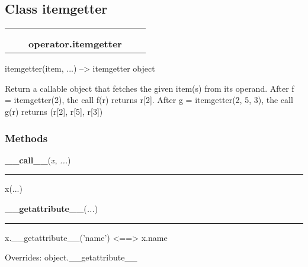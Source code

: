 \subsection{Class itemgetter}

    \label{operator:itemgetter}
\begin{tabular}{cccccc}
\multicolumn{2}{r}{\settowidth{\BCL}{object}\multirow{2}{\BCL}{object}}
&&
  \\\cline{3-3}
  &&\multicolumn{1}{c|}{}
&&
  \\
&&\multicolumn{2}{l}{\textbf{operator.itemgetter}}
\end{tabular}

itemgetter(item, ...) --{\textgreater} itemgetter object

Return a callable object that fetches the given item(s) from its operand. 
After f = itemgetter(2), the call f(r) returns r[2]. After g = 
itemgetter(2, 5, 3), the call g(r) returns (r[2], r[5], r[3])



  \subsubsection{Methods}

    \label{operator:itemgetter:__call__}

    \vspace{0.5ex}

\hspace{.8\funcindent}\begin{boxedminipage}{\funcwidth}

    \raggedright \textbf{\_\_call\_\_}(\textit{x}, \textit{...})

    \vspace{-1.5ex}

    \rule{\textwidth}{0.5\fboxrule}
\setlength{\parskip}{2ex}
    x(...)

\setlength{\parskip}{1ex}
    \end{boxedminipage}

    \vspace{0.5ex}

\hspace{.8\funcindent}\begin{boxedminipage}{\funcwidth}

    \raggedright \textbf{\_\_getattribute\_\_}(\textit{...})

    \vspace{-1.5ex}

    \rule{\textwidth}{0.5\fboxrule}
\setlength{\parskip}{2ex}
    x.\_\_getattribute\_\_('name') {\textless}=={\textgreater} x.name

\setlength{\parskip}{1ex}
      Overrides: object.\_\_getattribute\_\_

    \end{boxedminipage}

